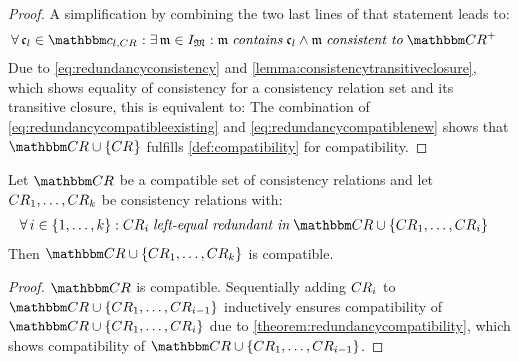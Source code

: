 \begin{proof}
    A simplification by combining the two last lines of that statement leads to:
    \begin{align*}
        & \nonumber 
        \forall \conditionelement{c}{l} \in \condition{c}{l, \consistencyrelation{CR}{}} : \exists \modeltuple{m} \in \metamodeltupleinstanceset{M} : \modeltuple{m} \containsmath \conditionelement{c}{l} \land \modeltuple{m} \consistenttomath \transitiveclosure{\consistencyrelationset{CR}}
    \end{align*}
    Due to \autoref{eq:redundancyconsistency} and \autoref{lemma:consistencytransitiveclosure}, which shows equality of consistency for a consistency relation set and its transitive closure, this is equivalent to:
    The combination of \autoref{eq:redundancycompatibleexisting} and \autoref{eq:redundancycompatiblenew} shows that $\consistencyrelationset{CR} \cup \setted{\consistencyrelation{CR}{}}$ fulfills \autoref{def:compatibility} for compatibility.
\end{proof}

\begin{corollary} \label{corollary:transitiveredundancycompatibility}
    Let $\consistencyrelationset{CR}$ be a compatible set of consistency relations and let $\consistencyrelation{CR}{1}, \dots, \consistencyrelation{CR}{k}$ be consistency relations with:
    \begin{align*}
        &
        \forall i \in \setted{1, \dots, k} : \consistencyrelation{CR}{i} \leftequalredundantinmath \consistencyrelationset{CR} \cup \setted{\consistencyrelation{CR}{1}, \dots, \consistencyrelation{CR}{i}}
    \end{align*}
    Then $\consistencyrelationset{CR} \cup \setted{\consistencyrelation{CR}{1}, \dots, \consistencyrelation{CR}{k}}$ is compatible.
\end{corollary}

\begin{proof}
    $\consistencyrelationset{CR}$ is compatible. Sequentially adding $\consistencyrelation{CR}{i}$ to $\consistencyrelationset{CR} \cup \setted{\consistencyrelation{CR}{1}, \dots, \consistencyrelation{CR}{i-1}}$ inductively ensures compatibility of $\consistencyrelationset{CR} \cup \setted{\consistencyrelation{CR}{1}, \dots, \consistencyrelation{CR}{i}}$ due to \autoref{theorem:redundancycompatibility}, which shows compatibility of $\consistencyrelationset{CR} \cup \setted{\consistencyrelation{CR}{1}, \dots, \consistencyrelation{CR}{i-1}}$.
\end{proof}

